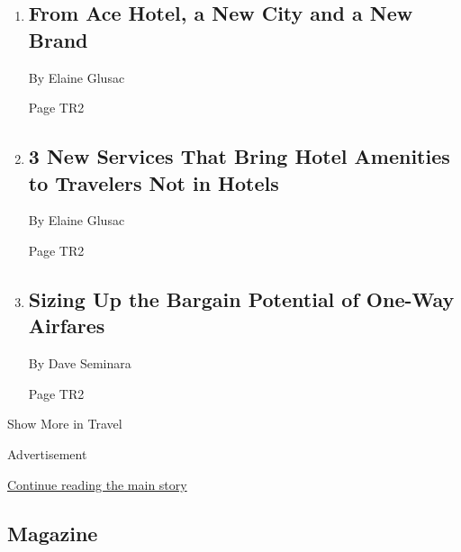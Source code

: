 \begin{enumerate}
\def\labelenumi{\arabic{enumi}.}
\item
  \href{/2018/06/25/travel/ace-hotel-kyoto.html}{}

  \hypertarget{from-ace-hotel-a-new-city-and-a-new-brand}{%
  \subsection{From Ace Hotel, a New City and a New
  Brand}\label{from-ace-hotel-a-new-city-and-a-new-brand}}

  By Elaine Glusac

  Page TR2
\item
  \href{/2018/06/25/travel/resortpass-easyo-dayuse-app.html}{}

  \hypertarget{3-new-services-that-bring-hotel-amenities-to-travelers-not-in-hotels}{%
  \subsection{3 New Services That Bring Hotel Amenities to Travelers Not
  in
  Hotels}\label{3-new-services-that-bring-hotel-amenities-to-travelers-not-in-hotels}}

  By Elaine Glusac

  Page TR2
\item
  \href{/2018/06/27/travel/one-way-airfares.html}{}

  \hypertarget{sizing-up-the-bargain-potential-of-one-way-airfares}{%
  \subsection{Sizing Up the Bargain Potential of One-Way
  Airfares}\label{sizing-up-the-bargain-potential-of-one-way-airfares}}

  By Dave Seminara

  Page TR2
\end{enumerate}

Show More in Travel

Advertisement

\protect\hyperlink{after-mid5}{Continue reading the main story}

\hypertarget{magazine}{%
\subsection{Magazine}\label{magazine}}

